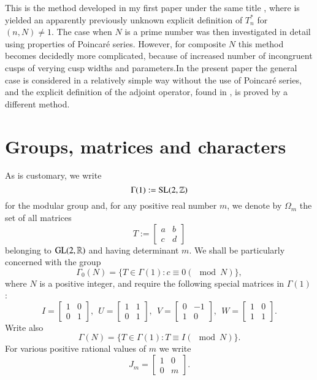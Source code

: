 This is the method developed in my first paper under the same title \cite{art10-key10}, where is yielded an apparently previously unknown explicit definition of $T^{*}_{n}$ for $(n,N)\neq 1$. The case when $N$ is a prime number was then investigated in detail using properties of Poincar\'e series. However, for composite $N$ this method becomes decidedly more complicated, because of increased number of incongruent cusps of verying cusp widths and parameters.\pageoriginale In the present paper the general case is considered in a relatively simple way without the use of Poincar\'e series, and the explicit definition of the adjoint operator, found in \cite{art10-key10}, is proved by a different method.

\section{Groups, matrices and characters}\label{art10-sec2}
As is customary, we write 
\setcounter{equation}{0}
\begin{equation}
\Gamma(1):=\operatorname{SL}(2,\mathbb{Z})\label{art10-eq2.1}
\end{equation}
for the modular group and, for any positive real number $m$, we denote by $\Omega_{m}$ the set of all matrices
\begin{equation}
T:=
\begin{bmatrix} 
a & b\\ 
c & d
\end{bmatrix}\label{art10-eq2.2}
\end{equation}
belonging to $\operatorname{GL}(2,\mathbb{R})$ and having determinant $m$. We shall be particularly concerned with the group
\begin{equation}
\Gamma_{0}(N)=\{T\in \Gamma(1):c\equiv 0(\mod N)\},\label{art10-eq2.3}
\end{equation}
where $N$ is a positive integer, and require the following special matrices in $\Gamma(1)$ :
\begin{equation}
I=
\begin{bmatrix}
1 & 0\\
0 & 1
\end{bmatrix}, \ \ 
U=
\begin{bmatrix}
1 & 1\\
0 & 1
\end{bmatrix}, \ \ 
V=
\begin{bmatrix}
0 & -1\\
1 & 0
\end{bmatrix}, \ \
W=
\begin{bmatrix}
1 & 0\\
1 & 1
\end{bmatrix}.\label{art10-eq2.4}
\end{equation}
Write also
\begin{equation}
\Gamma(N)=\{T\in \Gamma(1): T\equiv I(\mod N)\}.\label{art10-eq2.5}
\end{equation}
For various positive rational values of $m$ we write
\begin{equation}
J_{m}=
\begin{bmatrix}
1 & 0\\
0 & m
\end{bmatrix}.\label{art10-eq2.6}
\end{equation}


